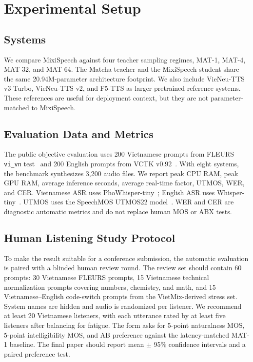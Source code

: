 \documentclass[10pt,twoside]{article}
\newcommand{\method}{MixiSpeech}
\newcommand{\mat}{MAT}
\begin{document}
\section{Experimental Setup}

\subsection{Systems}

We compare \method{} against four teacher sampling regimes, \mat-1, \mat-4,
\mat-32, and \mat-64. The Matcha teacher and the \method{} student share the
same 20.94M-parameter architecture footprint. We also include VieNeu-TTS v3
Turbo, VieNeu-TTS v2, and F5-TTS as larger pretrained reference systems. These
references are useful for deployment context, but they are not parameter-matched
to \method{}.

\subsection{Evaluation Data and Metrics}

The public objective evaluation uses 200 Vietnamese prompts from FLEURS
\texttt{vi\_vn} test~\cite{fleurs} and 200 English prompts from VCTK
v0.92~\cite{vctk}. With eight
systems, the benchmark synthesizes 3,200 audio files. We report peak CPU RAM,
peak GPU RAM, average inference seconds, average real-time factor, UTMOS, WER,
and CER. Vietnamese ASR uses PhoWhisper-tiny~\cite{phowhisper}; English ASR
uses Whisper-tiny~\cite{whisper}. UTMOS uses the SpeechMOS UTMOS22
model~\cite{utmos}. WER and CER are diagnostic automatic metrics and do not
replace human MOS or ABX tests.

\subsection{Human Listening Study Protocol}

To make the result suitable for a conference submission, the automatic
evaluation is paired with a blinded human review round. The review set should
contain 60 prompts: 30 Vietnamese FLEURS prompts, 15 Vietnamese technical
normalization prompts covering numbers, chemistry, and math, and 15
Vietnamese--English code-switch prompts from the VietMix-derived stress set.
System names are hidden and audio is randomized per listener. We recommend at
least 20 Vietnamese listeners, with each utterance rated by at least five
listeners after balancing for fatigue. The form asks for 5-point naturalness MOS,
5-point intelligibility MOS, and AB preference against the latency-matched
\mat-1 baseline. The final paper should report mean $\pm$ 95\% confidence
intervals and a paired preference test.
\end{document}

